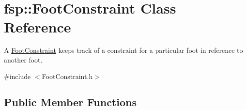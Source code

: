 \hypertarget{classfsp_1_1_foot_constraint}{\section{fsp\-:\-:Foot\-Constraint Class Reference}
\label{classfsp_1_1_foot_constraint}
}


A \hyperlink{classfsp_1_1_foot_constraint}{Foot\-Constraint} keeps track of a constraint for a particular foot in reference to another foot.  




{\ttfamily \#include $<$Foot\-Constraint.\-h$>$}

\subsection*{Public Member Functions}

